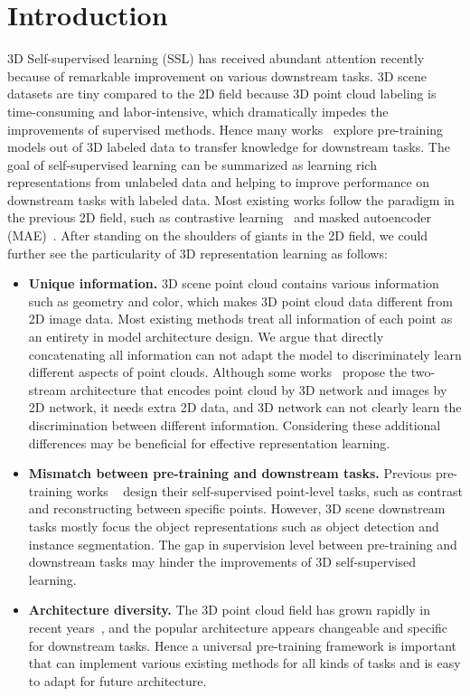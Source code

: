 \documentclass{article}
\begin{document}
\section{Introduction}
\vspace{-0.2cm}
3D Self-supervised learning (SSL) has received abundant attention recently because of remarkable improvement on various downstream tasks. 3D scene datasets are tiny compared to the 2D field because 3D point cloud labeling is time-consuming and labor-intensive, which dramatically impedes the improvements of supervised methods. 
Hence many works~\cite{PointContrast,ACT23,recon23,LANG-3D} explore pre-training models out of 3D labeled data to transfer knowledge for downstream tasks. 
The goal of self-supervised learning can be summarized as learning rich representations from unlabeled data and helping to improve performance on downstream tasks with labeled data. 
Most existing works follow the paradigm in the previous 2D field, such as contrastive learning~\cite{PointContrast,DepthContrast,CSC,Ponder} and masked autoencoder (MAE)~\cite{PointMAE,recon23,PointBERT,PointM2AE22}. 
After standing on the shoulders of giants in the 2D field, we could further see the particularity of 3D representation learning as follows:
\begin{itemize}[leftmargin=15pt, topsep=0pt, 
itemsep=0pt, parsep=2pt, partopsep=0pt
]
    \item \textbf{Unique information.} 3D scene point cloud contains various information such as geometry and color, which makes 3D point cloud data different from 2D image data. 
    Most existing methods \cite{PointContrast,CSC,DepthContrast} treat all information of each point as an entirety in model architecture design. 
    We argue that directly concatenating all information can not adapt the model to discriminately learn different aspects of point clouds. Although some works~\cite{DEMF, TokenFusion} propose the two-stream architecture that encodes point cloud by 3D network and images by 2D network, it needs extra 2D data, and 3D network can not clearly learn the discrimination between different information. Considering these additional differences may be beneficial for effective representation learning.
    \item \textbf{Mismatch between pre-training and downstream tasks.} Previous pre-training works ~\cite{PointContrast,CSC,PointMAE,PointM2AE22} design their self-supervised point-level tasks, such as contrast and reconstructing between specific points. 
    However, 3D scene downstream tasks mostly focus the object representations such as object detection and instance segmentation. The gap in supervision level between pre-training and downstream tasks may hinder the improvements of 3D self-supervised learning.
    \item \textbf{Architecture diversity.} 
    The 3D point cloud field has grown rapidly in recent years~\cite{PointNet++,MinkowskiEngine,GroupFree,FCAF3D,PointNext}, and the popular architecture appears changeable and specific for downstream tasks. Hence a universal pre-training framework is important that can implement various existing methods for all kinds of tasks and is easy to adapt for future architecture.
\end{itemize}
\end{document}
